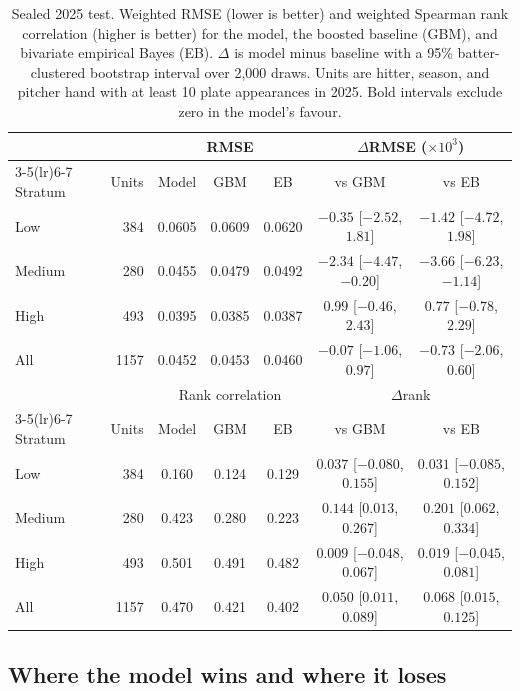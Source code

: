 \documentclass[11pt,letterpaper]{article}
\begin{document}
\begin{table}[t]
\centering
\small
\caption{Sealed 2025 test. Weighted RMSE (lower is better) and weighted Spearman rank correlation (higher is better) for the model, the boosted baseline (GBM), and bivariate empirical Bayes (EB). $\Delta$ is model minus baseline with a 95\% batter-clustered bootstrap interval over 2,000 draws. Units are hitter, season, and pitcher hand with at least 10 plate appearances in 2025. Bold intervals exclude zero in the model's favour.}
\label{tab:test}
\begin{tabular}{l r ccc cc}
\toprule
 & & \multicolumn{3}{c}{RMSE} & \multicolumn{2}{c}{$\Delta$RMSE ($\times 10^{3}$)} \\
\cmidrule(lr){3-5}\cmidrule(lr){6-7}
Stratum & Units & Model & GBM & EB & vs GBM & vs EB \\
\midrule
Low    & 384  & 0.0605 & 0.0609 & 0.0620 & $-0.35$ [$-2.52$, $1.81$] & $-1.42$ [$-4.72$, $1.98$] \\
Medium & 280  & 0.0455 & 0.0479 & 0.0492 & $\mathbf{-2.34}$ [$-4.47$, $-0.20$] & $\mathbf{-3.66}$ [$-6.23$, $-1.14$] \\
High   & 493  & 0.0395 & 0.0385 & 0.0387 & $0.99$ [$-0.46$, $2.43$] & $0.77$ [$-0.78$, $2.29$] \\
All    & 1157 & 0.0452 & 0.0453 & 0.0460 & $-0.07$ [$-1.06$, $0.97$] & $-0.73$ [$-2.06$, $0.60$] \\
\midrule
 & & \multicolumn{3}{c}{Rank correlation} & \multicolumn{2}{c}{$\Delta$rank} \\
\cmidrule(lr){3-5}\cmidrule(lr){6-7}
Stratum & Units & Model & GBM & EB & vs GBM & vs EB \\
\midrule
Low    & 384  & 0.160 & 0.124 & 0.129 & $0.037$ [$-0.080$, $0.155$] & $0.031$ [$-0.085$, $0.152$] \\
Medium & 280  & 0.423 & 0.280 & 0.223 & $\mathbf{0.144}$ [$0.013$, $0.267$] & $\mathbf{0.201}$ [$0.062$, $0.334$] \\
High   & 493  & 0.501 & 0.491 & 0.482 & $0.009$ [$-0.048$, $0.067$] & $0.019$ [$-0.045$, $0.081$] \\
All    & 1157 & 0.470 & 0.421 & 0.402 & $\mathbf{0.050}$ [$0.011$, $0.089$] & $\mathbf{0.068}$ [$0.015$, $0.125$] \\
\bottomrule
\end{tabular}
\end{table}

\subsection{Where the model wins and where it loses}
\label{sec:winslosses}
\end{document}
